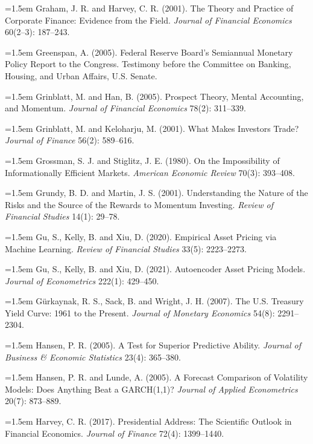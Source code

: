 \hangindent=1.5em Graham, J. R. and Harvey, C. R. (2001). The Theory and Practice of Corporate Finance: Evidence from the Field. \emph{Journal of Financial Economics} 60(2--3): 187--243.

\hangindent=1.5em Greenspan, A. (2005). Federal Reserve Board's Semiannual Monetary Policy Report to the Congress. Testimony before the Committee on Banking, Housing, and Urban Affairs, U.S. Senate.

\hangindent=1.5em Grinblatt, M. and Han, B. (2005). Prospect Theory, Mental Accounting, and Momentum. \emph{Journal of Financial Economics} 78(2): 311--339.

\hangindent=1.5em Grinblatt, M. and Keloharju, M. (2001). What Makes Investors Trade? \emph{Journal of Finance} 56(2): 589--616.

\hangindent=1.5em Grossman, S. J. and Stiglitz, J. E. (1980). On the Impossibility of Informationally Efficient Markets. \emph{American Economic Review} 70(3): 393--408.

\hangindent=1.5em Grundy, B. D. and Martin, J. S. (2001). Understanding the Nature of the Risks and the Source of the Rewards to Momentum Investing. \emph{Review of Financial Studies} 14(1): 29--78.

\hangindent=1.5em Gu, S., Kelly, B. and Xiu, D. (2020). Empirical Asset Pricing via Machine Learning. \emph{Review of Financial Studies} 33(5): 2223--2273.

\hangindent=1.5em Gu, S., Kelly, B. and Xiu, D. (2021). Autoencoder Asset Pricing Models. \emph{Journal of Econometrics} 222(1): 429--450.

\hangindent=1.5em G\"urkaynak, R. S., Sack, B. and Wright, J. H. (2007). The U.S. Treasury Yield Curve: 1961 to the Present. \emph{Journal of Monetary Economics} 54(8): 2291--2304.

\hangindent=1.5em Hansen, P. R. (2005). A Test for Superior Predictive Ability. \emph{Journal of Business \& Economic Statistics} 23(4): 365--380.

\hangindent=1.5em Hansen, P. R. and Lunde, A. (2005). A Forecast Comparison of Volatility Models: Does Anything Beat a GARCH(1,1)? \emph{Journal of Applied Econometrics} 20(7): 873--889.

\hangindent=1.5em Harvey, C. R. (2017). Presidential Address: The Scientific Outlook in Financial Economics. \emph{Journal of Finance} 72(4): 1399--1440.

